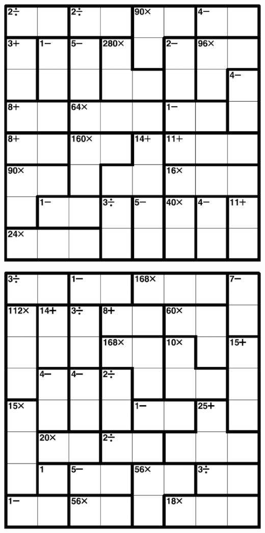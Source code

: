 
\includegraphics[scale=1]{Gambar/Lampiran/8x8_7.png}

\includegraphics[scale=1]{Gambar/Lampiran/8x8_8.png}
